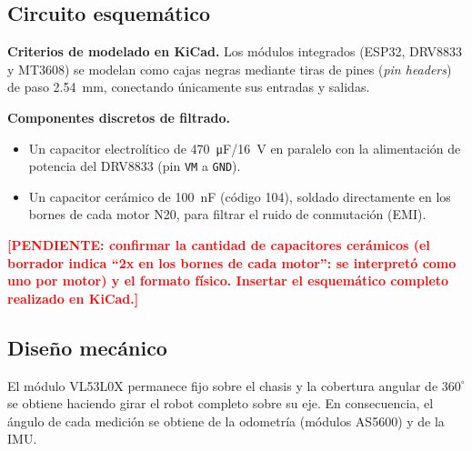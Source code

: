 \documentclass[12pt,a4paper]{article}
\newcommand{\pendiente}[1]{\textcolor{red}{\textbf{[PENDIENTE: #1]}}}
\begin{document}
\subsection{Circuito esquemático}
\begin{visar}
\textbf{Criterios de modelado en KiCad.} Los módulos integrados (ESP32, DRV8833 y MT3608) se modelan como cajas negras mediante tiras de pines (\emph{pin headers}) de paso \SI{2,54}{mm}, conectando únicamente sus entradas y salidas.

\textbf{Componentes discretos de filtrado.}
\begin{itemize}[nosep]
  \item Un capacitor electrolítico de \SI{470}{\micro F}/\SI{16}{V} en paralelo con la alimentación de potencia del DRV8833 (pin \texttt{VM} a \texttt{GND}).
  \item Un capacitor cerámico de \SI{100}{nF} (código 104), soldado directamente en los bornes de cada motor N20, para filtrar el ruido de conmutación (EMI).
\end{itemize}
\end{visar}
\pendiente{confirmar la cantidad de capacitores cerámicos (el borrador indica ``2x en los bornes de cada motor'': se interpretó como uno por motor) y el formato físico. Insertar el esquemático completo realizado en KiCad.}

\subsection{Diseño mecánico}
El módulo VL53L0X permanece fijo sobre el chasis y la cobertura angular de $360^\circ$ se obtiene haciendo girar el robot completo sobre su eje. En consecuencia, el ángulo de cada medición se obtiene de la odometría (módulos AS5600) y de la IMU.
\end{document}
